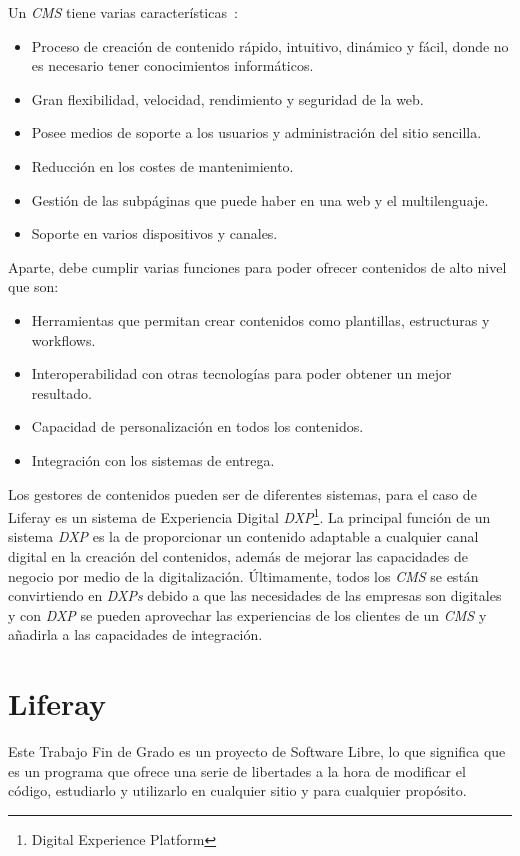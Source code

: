 \documentclass[a4paper, 12pt]{book}
\begin{document}
\vspace{5mm}
Un \emph{CMS} tiene varias características~\cite{cms_misc}:
\begin{itemize}
    \item Proceso de creación de contenido rápido, intuitivo, dinámico y fácil, donde no es necesario tener conocimientos informáticos.
    \item Gran flexibilidad, velocidad, rendimiento y seguridad de la web.
    \item Posee medios de soporte a los usuarios y administración del sitio sencilla.
    \item Reducción en los costes de mantenimiento.
    \item Gestión de las subpáginas que puede haber en una web y el multilenguaje.
    \item Soporte en varios dispositivos y canales.
\end{itemize}

\vspace{5mm}
Aparte, debe cumplir varias funciones para poder ofrecer contenidos de alto nivel que son: 
\begin{itemize}
    \item Herramientas que permitan crear contenidos como plantillas, estructuras y workflows.
    \item Interoperabilidad con otras tecnologías para poder obtener un mejor resultado.
    \item Capacidad de personalización en todos los contenidos.
    \item Integración con los sistemas de entrega.
\end{itemize}

\vspace{5mm}
Los gestores de contenidos pueden ser de diferentes sistemas, para el caso de Liferay es un sistema de Experiencia Digital \textit{DXP}\footnote{Digital Experience Platform}. La principal función de un sistema \textit{DXP} es la de proporcionar un contenido adaptable a cualquier canal digital en la creación del contenidos, además de mejorar las capacidades de negocio por medio de la digitalización. Últimamente, todos los \textit{CMS} se están convirtiendo en \textit{DXPs} debido a que las necesidades de las empresas son digitales y con \textit{DXP} se pueden aprovechar las experiencias de los clientes de un \textit{CMS} y añadirla a las capacidades de integración.


\section{Liferay}
\label{subsec:liferay}
Este Trabajo Fin de Grado es un proyecto de Software Libre, lo que significa que es un programa que ofrece una serie de libertades a la hora de modificar el código, estudiarlo y utilizarlo en cualquier sitio y para cualquier propósito.
\end{document}
